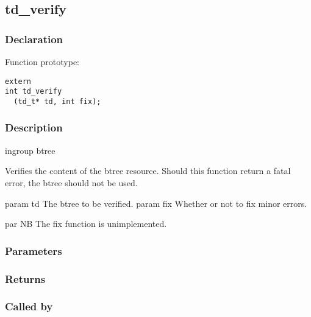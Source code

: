 
\newpage
\subsection{td\_verify}
\subsubsection{Declaration} Function prototype:

\begin{verbatim}
extern
int td_verify
  (td_t* td, int fix);
\end{verbatim}

\subsubsection{Description}


 ingroup btree

 Verifies the content of the btree resource.
 Should this function return a fatal error, the btree should not be used.

 param td The btree to be verified.
 param fix Whether or not to fix minor errors.

 par NB
 The fix function is unimplemented.
 

\subsubsection{Parameters}
\subsubsection{Returns}
\subsubsection{Called by}

